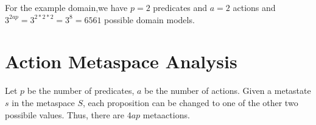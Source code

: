 \documentclass{article}
\begin{document}
For the example domain,we have $p=2$ predicates and $a=2$ actions and $3^{2ap} = 3^{2*2*2} = 3^8 = 6561$ possible domain models.

\section*{Action Metaspace Analysis}
Let $p$ be the number of predicates, $a$ be the number of actions. Given a metastate $s$ in the metaspace $S$, each proposition can be changed to one of the other two possibile values. Thus, there are $4ap$ metaactions.
\end{document}

